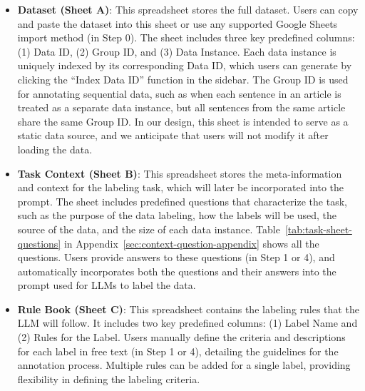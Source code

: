 \begin{itemize}

\item \textbf{Dataset (Sheet A)}:
This spreadsheet stores the full dataset.
Users can copy and paste the dataset into this sheet or use any supported Google Sheets import method (in Step 0).
The sheet includes three key predefined columns: (1) Data ID, (2) Group ID, and (3) Data Instance. 
Each data instance is uniquely indexed by its corresponding Data ID, which users can generate by clicking the ``Index Data ID'' function in the sidebar. 
The Group ID is used for annotating sequential data, such as when each sentence in an article is treated as a separate data instance, but all sentences from the same article share the same Group ID.
In our design, this sheet is intended to serve as a static data source, and we anticipate that users will not modify it after loading the data.


\item \textbf{Task Context (Sheet B)}:
This spreadsheet stores the meta-information and context for the labeling task, which will later be incorporated into the prompt. 
The sheet includes predefined questions that characterize the task, such as the purpose of the data labeling, how the labels will be used, the source of the data, and the size of each data instance.
Table~\ref{tab:task-sheet-questions} in Appendix~\ref{sec:context-question-appendix} shows all the questions.
Users provide answers to these questions (in Step 1 or 4), and \system automatically incorporates both the questions and their answers into the prompt used for LLMs to label the data.


    
\item \textbf{Rule Book (Sheet C)}: 
This spreadsheet contains the labeling rules that the LLM will follow.
It includes two key predefined columns: (1) Label Name and (2) Rules for the Label. 
Users manually define the criteria and descriptions for each label in free text (in Step 1 or 4), detailing the guidelines for the annotation process. 
Multiple rules can be added for a single label, providing flexibility in defining the labeling criteria.



\end{itemize}
